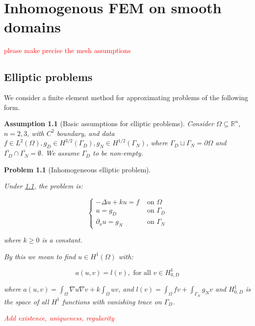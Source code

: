 \documentclass[english,a4paper,10pt,oneside]{scrbook}	%
\theoremstyle{break}
\newtheorem{ass}[equation]{Assumption}
\newtheorem{pb}[equation]{Problem}
\theoremstyle{remark}
\newcommand{\mR}{\mathbb{R}}
\newcommand{\ds}{\displaystyle}
\begin{document}
\chapter{Inhomogenous FEM on smooth domains}

\textcolor{red}{	please make precise the mesh assumptions}

\section{Elliptic problems}

We consider a finite element method for approximating problems of the following form.

\begin{ass}[Basic assumptions for elliptic problems]
\label{ass:inh_ell}
Consider $\Omega \subseteq \mR^n$, $n=2,3$, with $C^2$ boundary, and data $f \in L^2(\Omega), g_D \in H^{3/2}(\Gamma_D), g_N \in H^{1/2}(\Gamma_N)$, where $\Gamma_D \sqcup \Gamma_N = \partial \Omega$ and $\overline{\Gamma_D}\cap \overline{\Gamma_N}=\emptyset$. We assume $\Gamma_D$ to be non-empty.

\end{ass}

\begin{pb}[Inhomogeneous elliptic problem]
\label{pb:inh_elliptic}

Under \cref{ass:inh_ell}, the problem is:

$$
\left\{\begin{matrix}
-\Delta u + k u = f & \text{ on } \Omega \\ 
u = g_D & \text{ on } \Gamma_D \\ 
\partial_\nu u = g_N & \text{ on } \Gamma_N 
\end{matrix}\right.
$$

where $k \geq 0$ is a constant.

By this we mean to find $u \in H^1(\Omega)$ with:

$$a(u,v) = l(v), \text{ for all } v \in H^1_{0,D}$$

where $a(u,v) =\ds \int_{\Omega}\nabla u \nabla v + k \int_{\Omega} u  v$, and $l(v) = \ds\int_{\Omega}f v + \int_{\Gamma_N} g_{N}v$ and $H^1_{0,D}$ is the space of all $H^1$ functions with vanishing trace on $\Gamma_D$.

\textcolor{red}{Add existence, uniqueness, regularity}

\end{pb}

\end{document}
